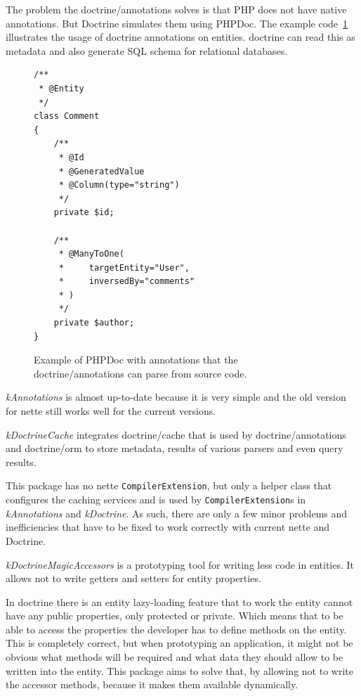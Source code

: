 The problem the doctrine/annotations solves is that PHP does not have native annotations. But Doctrine simulates them using PHPDoc. The example code~\ref{fig:php:annotations-example} illustrates the usage of \gls{doctrine} annotations on entities. \gls{doctrine} can read this as metadata and also generate SQL schema for relational databases.

\begin{figure} \label{fig:php:annotations-example}
\begin{lstlisting}
/**
 * @Entity
 */
class Comment
{
    /**
     * @Id
     * @GeneratedValue
     * @Column(type="string")
     */
    private $id;

    /**
     * @ManyToOne(
     *     targetEntity="User",
     *     inversedBy="comments"
     * )
     */
    private $author;
}
\end{lstlisting}
\caption{Example of PHPDoc with annotations that the doctrine/annotations can parse from source code.}
\end{figure}

\textit{\gls{kAnnotations}} is almost up-to-date because it is very simple and the old version for \gls{nette} still works well for the current versions.

 \label{sec:state:doctrine-cache}

\textit{\gls{kDoctrineCache}} integrates doctrine/cache that is used by doctrine/annotations and doctrine/orm to store metadata, results of various parsers and even query results.

This package has no \gls{nette} \lstinline{CompilerExtension}, but only a helper class that configures the caching services and is used by \lstinline{CompilerExtension}s in \textit{\gls{kAnnotations}} and \textit{\gls{kDoctrine}}. As such, there are only a few minor problems and inefficiencies that have to be fixed to work correctly with current \gls{nette} and Doctrine.

 \label{sec:state:doctrine-magic-accessors}

\textit{\gls{kDoctrineMagicAccessors}} is a prototyping tool for writing less code in entities. It allows not to write getters and setters for entity properties.

In \gls{doctrine} there is an entity lazy-loading feature that to work the entity cannot have any public properties, only protected or private. Which means that to be able to access the properties the developer has to define methods on the entity. This is completely correct, but when prototyping an application, it might not be obvious what methods will be required and what data they should allow to be written into the entity. This package aims to solve that, by allowing not to write the accessor methods, because it makes them available dynamically.


